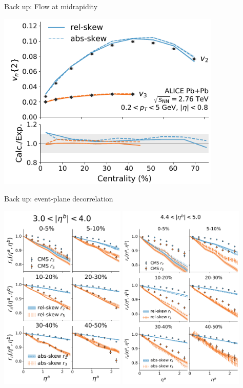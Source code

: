 \documentclass[11pt]{beamer}
\begin{document}
\begin{frame}[noframenumbering]{Back up: Flow at midrapidity}
\begin{center}
\includegraphics[width=0.8\textwidth]{vn_cen.pdf}
\end{center}
\end{frame}



\begin{frame}[noframenumbering]{Back up: event-plane decorrelation}
\begin{center}
\includegraphics[width=0.45\textwidth]{evt_pln_decorr_near.pdf}
\quad\quad
\includegraphics[width=0.45\textwidth]{evt_pln_decorr_far.pdf}
\end{center}
\end{frame}
\end{document}
